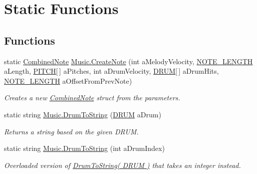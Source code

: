 \hypertarget{group___music_stat_func}{}\section{Static Functions}
\label{group___music_stat_func}
\subsection*{Functions}
\begin{DoxyCompactItemize}
\item 
static \hyperlink{group___music_structs_struct_music_1_1_combined_note}{Combined\+Note} \hyperlink{group___music_stat_func_gaaf74885e43eb623f64f961985fadcd08}{Music.\+Create\+Note} (int a\+Melody\+Velocity, \hyperlink{group___music_enums_gaf11b5f079adbb21c800b9eca1c5c3cbd}{N\+O\+T\+E\+\_\+\+L\+E\+N\+G\+TH} a\+Length, \hyperlink{group___music_enums_ga508f69b199ea518f935486c990edac1d}{P\+I\+T\+CH}\mbox{[}$\,$\mbox{]} a\+Pitches, int a\+Drum\+Velocity, \hyperlink{group___music_enums_gade475b4382c7066d1af13e7c13c029b6}{D\+R\+UM}\mbox{[}$\,$\mbox{]} a\+Drum\+Hits, \hyperlink{group___music_enums_gaf11b5f079adbb21c800b9eca1c5c3cbd}{N\+O\+T\+E\+\_\+\+L\+E\+N\+G\+TH} a\+Offset\+From\+Prev\+Note)
\begin{DoxyCompactList}\small\item\em Creates a new \hyperlink{group___music_structs_struct_music_1_1_combined_note}{Combined\+Note} struct from the parameters. \end{DoxyCompactList}\item 
static string \hyperlink{group___music_stat_func_gaf5f64ebe9a7e036e07f283e41f26d22b}{Music.\+Drum\+To\+String} (\hyperlink{group___music_enums_gade475b4382c7066d1af13e7c13c029b6}{D\+R\+UM} a\+Drum)
\begin{DoxyCompactList}\small\item\em Returns a string based on the given D\+R\+UM. \end{DoxyCompactList}\item 
static string \hyperlink{group___music_stat_func_gab74179676b93b41cde2d1cc18af0e788}{Music.\+Drum\+To\+String} (int a\+Drum\+Index)
\begin{DoxyCompactList}\small\item\em Overloaded version of \hyperlink{group___music_stat_func_gaf5f64ebe9a7e036e07f283e41f26d22b}{Drum\+To\+String( D\+R\+U\+M )} that takes an integer instead. \end{DoxyCompactList}\item 

\end{DoxyCompactItemize}
